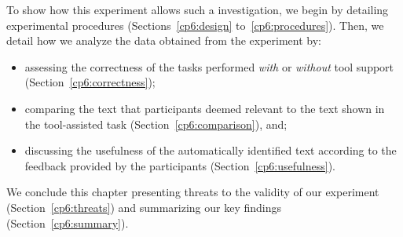 To show how this experiment allows such a investigation, we begin by detailing
experimental procedures (Sections~\ref{cp6:design} to~\ref{cp6:procedures}).
Then, we detail how we analyze the data obtained from the experiment by:

\newpage

\begin{itemize}
    \item assessing the correctness of the tasks performed \textit{with} or \textit{without} tool support (Section~\ref{cp6:correctness});
    \item comparing  the text that participants deemed relevant to the text 
    shown in the tool-assisted task (Section~\ref{cp6:comparison}), and;
    \item discussing the usefulness of the automatically identified text according to the feedback provided by the participants (Section~\ref{cp6:usefulness}).
\end{itemize}
 
We conclude this chapter presenting threats to the validity of our experiment (Section~\ref{cp6:threats}) and 
 summarizing our key findings (Section~\ref{cp6:summary}).


 
 
 
 
 
 
 
 
 
 


































